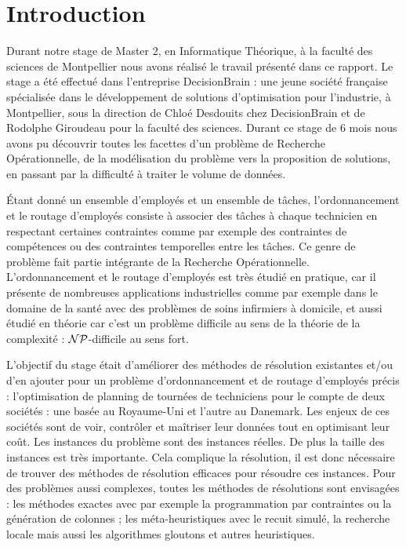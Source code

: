 \chapter*{Introduction}
Durant notre stage de Master 2, en Informatique Théorique, à la faculté des sciences de Montpellier nous avons réalisé le travail présenté dans ce rapport. Le stage a été effectué dans l'entreprise DecisionBrain : une jeune société française spécialisée dans le développement de solutions d'optimisation pour l'industrie, à Montpellier, sous la direction de Chloé Desdouits chez DecisionBrain et de Rodolphe Giroudeau pour la faculté des sciences.
Durant ce stage de 6 mois nous avons pu découvrir toutes les facettes d'un problème de Recherche Opérationnelle, de la modélisation du problème vers la proposition de solutions, en passant par la difficulté à traiter le volume de données.

Étant donné un ensemble d'employés et un ensemble de tâches, l'ordonnancement et le routage d'employés consiste à associer des tâches à chaque technicien en respectant certaines contraintes comme par exemple des contraintes de compétences ou des contraintes temporelles entre les tâches.
Ce genre de problème fait partie intégrante de la Recherche Opérationnelle. L'ordonnancement et le routage d'employés est très étudié en pratique, car il présente de nombreuses applications industrielles comme par exemple dans le domaine de la santé avec des problèmes de soins infirmiers à domicile, et aussi étudié en théorie car c'est un problème difficile au sens de la théorie de la complexité : $\mathcal{NP}$-difficile au sens fort.


L'objectif du stage était d'améliorer des méthodes de résolution existantes et/ou d'en ajouter pour un problème d'ordonnancement et de routage d'employés précis : l'optimisation de planning de tournées de techniciens pour le compte de deux sociétés : une basée au Royaume-Uni et l'autre au Danemark.
Les enjeux de ces sociétés sont de voir, contrôler et maîtriser leur données tout en optimisant leur coût.
Les instances du problème sont des instances réelles.
De plus la taille des instances est très importante.
Cela complique la résolution, il est donc nécessaire de trouver des méthodes de résolution efficaces pour résoudre ces instances.
Pour des problèmes aussi complexes, toutes les méthodes de résolutions sont envisagées : les méthodes exactes avec par exemple la programmation par contraintes ou la génération de colonnes ; les méta-heuristiques avec le recuit simulé, la recherche locale mais aussi les algorithmes gloutons et autres heuristiques.

